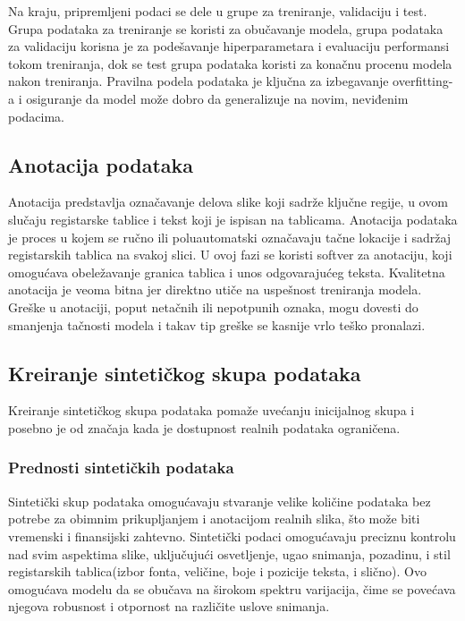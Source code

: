 \documentclass[a4paper,12pt]{article}
\begin{document}
	Na kraju, pripremljeni podaci se dele u grupe za treniranje, validaciju i test. Grupa podataka za treniranje se koristi za obučavanje modela, grupa podataka za validaciju korisna je za podešavanje hiperparametara i evaluaciju performansi tokom treniranja, dok se test grupa podataka koristi za konačnu procenu modela nakon treniranja. Pravilna podela podataka je ključna za izbegavanje overfitting-a i osiguranje da model može dobro da generalizuje na novim, neviđenim podacima.
	
	\subsection{Anotacija podataka}
	Anotacija predstavlja označavanje delova slike koji sadrže ključne regije, u ovom slučaju registarske tablice i tekst koji je ispisan na tablicama. Anotacija podataka je proces u kojem se ručno ili poluautomatski označavaju tačne lokacije i sadržaj registarskih tablica na svakoj slici. U ovoj fazi se koristi softver za anotaciju, koji omogućava obeležavanje granica tablica i unos odgovarajućeg teksta. Kvalitetna anotacija je veoma bitna jer direktno utiče na uspešnost treniranja modela. Greške u anotaciji, poput netačnih ili nepotpunih oznaka, mogu dovesti do smanjenja tačnosti modela i takav tip greške se kasnije vrlo teško pronalazi.
	
	\subsection{Kreiranje sintetičkog skupa podataka}
	Kreiranje sintetičkog skupa podataka pomaže uvećanju inicijalnog skupa i posebno je od značaja kada je dostupnost realnih podataka ograničena.
	
	\subsubsection{Prednosti sintetičkih podataka}
	Sintetički skup podataka omogućavaju stvaranje velike količine podataka bez potrebe za obimnim prikupljanjem i anotacijom realnih slika, što može biti vremenski i finansijski zahtevno. Sintetički podaci omogućavaju preciznu kontrolu nad svim aspektima slike, uključujući osvetljenje, ugao snimanja, pozadinu, i stil registarskih tablica(izbor fonta, veličine, boje i pozicije teksta, i slično). Ovo omogućava modelu da se obučava na širokom spektru varijacija, čime se povećava njegova robusnost i otpornost na različite uslove snimanja.
	
\end{document}
